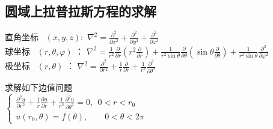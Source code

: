 \subsection{圆域上拉普拉斯方程的求解}
直角坐标~ $(x,y,z): $	{ 	$ \displaystyle  \nabla ^{2}  = \frac{\partial ^2}{\partial x^2} +\frac{\partial^2 }{\partial y^2} +\frac{\partial^2  }{\partial z^2}$}\\ 	
球坐标~ $	(r,\theta, \varphi )$ ：
{ 	$ \displaystyle  \nabla ^{2} =\frac{1}{r^2} \frac{\partial }{\partial r} (r^2\frac{\partial }{\partial r} )+
	\frac{1}{r^2 \sin \theta  } \frac{\partial }{\partial \theta } (\sin \theta \frac{\partial }{\partial \theta } )
	+\frac{1}{r^2 \sin \theta  } \frac{\partial^2}{\partial\varphi ^2}$ } \\ 	
 极坐标~ $	(r,\theta)$ ：
 { 	$ \displaystyle  \nabla ^{2} =\frac{\partial ^2 }{\partial r^2 } +\frac{1}{r } \frac{\partial }{\partial r } +
	\frac{1}{r^2 } \frac{\partial ^2 }{\partial \theta ^2 } $ }\\ 	

\begin{example} %
	求解如下边值问题\\
{ $  \displaystyle  \left \{ 
	\begin{array}{cc}
		\displaystyle {	\frac{\partial^2 u }{\partial r^2 } +\frac{1}{r } \frac{\partial u }{\partial r } +
			\frac{1}{r^2 } \frac{\partial ^2 u }{\partial \theta ^2
		} } =0, ~~ 0<r<r_0\\
		u(r_0,\theta )=f(\theta ) ,~~~~~~~~~ 0<\theta <2\pi 
	\end{array}
	\right. $}  
\end{example}

